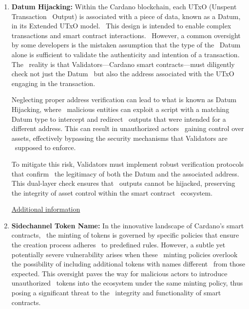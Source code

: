 \documentclass{scrreport}
\begin{document}
\begin{enumerate}
    \item \textbf{Datum Hijacking:} Within the Cardano blockchain, each UTxO (Unspent Transaction \
    Output) is associated with a piece of data, known as a Datum, in its Extended UTxO model. \
    This design is intended to enable complex transactions and smart contract interactions. \
    However, a common oversight by some developers is the mistaken assumption that the type of the \
    Datum alone is sufficient to validate the authenticity and intention of a transaction. The \
    reality is that Validators—Cardano smart contracts—must diligently check not just the Datum \
    but also the address associated with the UTxO engaging in the transaction.\

    Neglecting proper address verification can lead to what is known as Datum Hijacking, where \
    malicious entities can exploit a script with a matching Datum type to intercept and redirect \
    outputs that were intended for a different address. This can result in unauthorized actors \
    gaining control over assets, effectively bypassing the security mechanisms that Validators are \
    supposed to enforce.\

    To mitigate this risk, Validators must implement robust verification protocols that confirm \
    the legitimacy of both the Datum and the associated address. This dual-layer check ensures that \
    outputs cannot be hijacked, preserving the integrity of asset control within the smart contract \
    ecosystem.

    \href{https://github.com/input-output-hk/Certification-working-group/blob/vuln-from-audits/Cardano%20Threat%20Intelligence/Vulnerabilities/CTI-2023-ADA-11-01.md}{Additional information}
    
    \item \textbf{Sidechannel Token Name:} In the innovative landscape of Cardano's smart contracts, \
    the minting of tokens is governed by specific policies that ensure the creation process adheres \
    to predefined rules. However, a subtle yet potentially severe vulnerability arises when these \
    minting policies overlook the possibility of including additional tokens with names different \
    from those expected. This oversight paves the way for malicious actors to introduce unauthorized \
    tokens into the ecosystem under the same minting policy, thus posing a significant threat to the \
    integrity and functionality of smart contracts.\


\end{enumerate}
\end{document}
